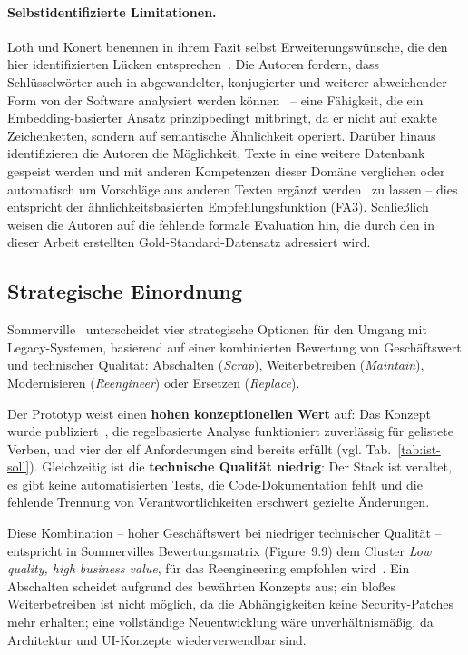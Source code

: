 \paragraph{Selbstidentifizierte Limitationen.}

Loth und Konert benennen in ihrem Fazit selbst Erweiterungswünsche, die den hier identifizierten Lücken entsprechen~\cite{loth2022kompetenzeditor,loth2022masterprojekt}.
Die Autoren fordern, dass \glqq Schlüsselwörter auch in abgewandelter, konjugierter und weiterer abweichender Form von der Software analysiert werden können\grqq~\cite{loth2022kompetenzeditor} -- eine Fähigkeit, die ein Embedding-basierter Ansatz prinzipbedingt mitbringt, da er nicht auf exakte Zeichenketten, sondern auf semantische Ähnlichkeit operiert.
Darüber hinaus identifizieren die Autoren die Möglichkeit, Texte \glqq in eine weitere Datenbank gespeist werden und mit anderen Kompetenzen dieser Domäne verglichen oder automatisch um Vorschläge aus anderen Texten ergänzt werden\grqq~\cite{loth2022kompetenzeditor} zu lassen -- dies entspricht der ähnlichkeitsbasierten Empfehlungsfunktion (FA3).
Schließlich weisen die Autoren auf die fehlende formale Evaluation hin, die durch den in dieser Arbeit erstellten Gold-Standard-Datensatz adressiert wird.

\subsection{Strategische Einordnung}\label{sec:strategische-einordnung}

Sommerville~\cite{sommerville2016software} unterscheidet vier strategische Optionen für den Umgang mit Legacy-Systemen, basierend auf einer kombinierten Bewertung von Geschäftswert und technischer Qualität:
Abschalten (\emph{Scrap}), Weiterbetreiben (\emph{Maintain}), Modernisieren (\emph{Reengineer}) oder Ersetzen (\emph{Replace}).

Der Prototyp weist einen \textbf{hohen konzeptionellen Wert} auf: Das Konzept wurde publiziert~\cite{loth2022kompetenzeditor}, die regelbasierte Analyse funktioniert zuverlässig für gelistete Verben, und vier der elf Anforderungen sind bereits erfüllt (vgl. Tab.~\ref{tab:ist-soll}).
Gleichzeitig ist die \textbf{technische Qualität niedrig}: Der Stack ist veraltet, es gibt keine automatisierten Tests, die Code-Dokumentation fehlt und die fehlende Trennung von Verantwortlichkeiten erschwert gezielte Änderungen.

Diese Kombination -- hoher Geschäftswert bei niedriger technischer Qualität -- entspricht in Sommervilles Bewertungsmatrix (Figure~9.9) dem Cluster \emph{Low quality, high business value}, für das Reengineering empfohlen wird~\cite{sommerville2016software}.
Ein Abschalten scheidet aufgrund des bewährten Konzepts aus; ein bloßes Weiterbetreiben ist nicht möglich, da die Abhängigkeiten keine Security-Patches mehr erhalten; eine vollständige Neuentwicklung wäre unverhältnismäßig, da Architektur und UI-Konzepte wiederverwendbar sind.

